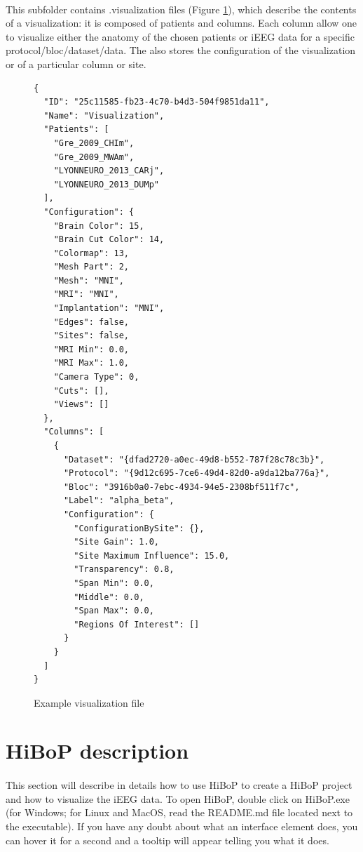 \documentclass[a4paper]{article}
\begin{document}
\paragraph{} This subfolder contains .visualization files (Figure \ref{visualizationFile}), which describe the contents of a visualization: it is composed of patients and columns. Each column allow one to visualize either the anatomy of the chosen patients or iEEG data for a specific protocol/bloc/dataset/data. The also stores the configuration of the visualization or of a particular column or site.
\begin{figure}[H]
\begin{lstlisting}
{
  "ID": "25c11585-fb23-4c70-b4d3-504f9851da11",
  "Name": "Visualization",
  "Patients": [
    "Gre_2009_CHIm",
    "Gre_2009_MWAm",
    "LYONNEURO_2013_CARj",
    "LYONNEURO_2013_DUMp"
  ],
  "Configuration": {
    "Brain Color": 15,
    "Brain Cut Color": 14,
    "Colormap": 13,
    "Mesh Part": 2,
    "Mesh": "MNI",
    "MRI": "MNI",
    "Implantation": "MNI",
    "Edges": false,
    "Sites": false,
    "MRI Min": 0.0,
    "MRI Max": 1.0,
    "Camera Type": 0,
    "Cuts": [],
    "Views": []
  },
  "Columns": [
    {
      "Dataset": "{dfad2720-a0ec-49d8-b552-787f28c78c3b}",
      "Protocol": "{9d12c695-7ce6-49d4-82d0-a9da12ba776a}",
      "Bloc": "3916b0a0-7ebc-4934-94e5-2308bf511f7c",
      "Label": "alpha_beta",
      "Configuration": {
        "ConfigurationBySite": {},
        "Site Gain": 1.0,
        "Site Maximum Influence": 15.0,
        "Transparency": 0.8,
        "Span Min": 0.0,
        "Middle": 0.0,
        "Span Max": 0.0,
        "Regions Of Interest": []
      }
    }
  ]
}
\end{lstlisting}
\caption{\label{visualizationFile}Example visualization file}
\end{figure}
\section{HiBoP description}\label{UI}
\paragraph{} This section will describe in details how to use HiBoP to create a HiBoP project and how to visualize the iEEG data. To open HiBoP, double click on HiBoP.exe (for Windows; for Linux and MacOS, read the README.md file located next to the executable). If you have any doubt about what an interface element does, you can hover it for a second and a tooltip will appear telling you what it does.
\end{document}

